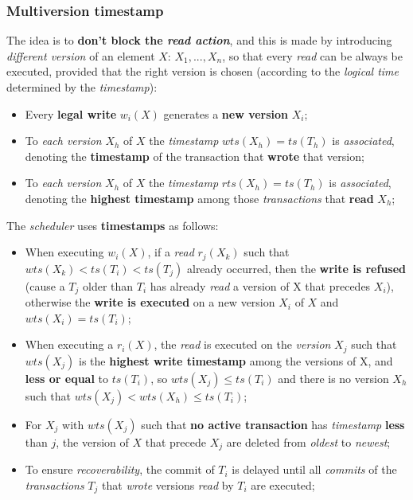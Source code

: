 \documentclass{article}
\begin{document}
\subsubsection{Multiversion timestamp}
The idea is to \textbf{don't block the \emph{read action}}, and this is made by introducing \emph{different version} of an element $X$: $X_1, ... , X_n$, so that every \emph{read} can be always be executed, provided that the right version is chosen (according to the \emph{logical time} determined by the \emph{timestamp}):
\begin{itemize}
\item Every \textbf{legal write} $w_i(X)$ generates a \textbf{new version} $X_i$;
\item To \emph{each version} $X_h$ of $X$ the \emph{timestamp} $wts(X_h) = ts(T_h)$ is \emph{associated}, denoting the \textbf{timestamp} of the transaction that \textbf{wrote} that version;
\item To \emph{each} \emph{version} $X_h$ of $X$ the \emph{timestamp} $rts(X_h) = ts(T_h)$ is \emph{associated}, denoting the \textbf{highest timestamp} among those \emph{transactions} that \textbf{read} $X_h$;
\end{itemize}
The \emph{scheduler} uses \textbf{timestamps} as follows:
\begin{itemize}
\item When executing $w_i(X)$, if a \emph{read} $r_j(X_k)$ such that $wts(X_k) < ts(T_i) < ts(T_j)$ already occurred, then the \textbf{write is refused} (cause a $T_j$ older than $T_i$ has already \emph{read} a version of X that precedes $X_i$), otherwise the \textbf{write is executed} on a new version $X_i$ of $X$ and $wts(X_i) = ts(T_i)$;
\item When executing a $r_i(X)$, the \emph{read} is executed on the \emph{version} $X_j$ such that $wts(X_j)$ is the \textbf{highest write timestamp} among the versions of X, and \textbf{less or equal} to $ts(T_i)$, so $wts(X_j) \leq ts(T_i)$ and there is no version $X_h$ such that $wts(X_j) < wts(X_h) \leq ts(T_i)$;
\item For $X_j$ with $wts(X_j)$ such that \textbf{no active transaction} has \emph{timestamp} \textbf{less} than $j$, the version of $X$ that precede $X_j$ are deleted from \emph{oldest} to \emph{newest};
\item To ensure \emph{recoverability}, the commit of $T_i$ is delayed until all \emph{commits} of the \emph{transactions} $T_j$ that \emph{wrote} versions \emph{read} by $T_i$ are executed;
\end{itemize}
\end{document}
